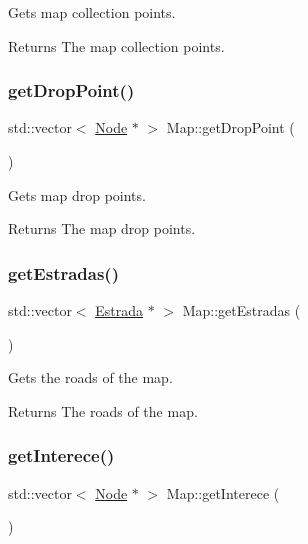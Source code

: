 Gets map collection points. 

\begin{DoxyReturn}{Returns}
The map collection points. 
\end{DoxyReturn}
\mbox{\label{class_map_a28915a48f8ddc0b8573197241f496337}} 
\subsubsection{\texorpdfstring{getDropPoint()}{getDropPoint()}}
{\footnotesize\ttfamily std\+::vector$<$ \mbox{\hyperlink{class_node}{Node}} $\ast$ $>$ Map\+::get\+Drop\+Point (\begin{DoxyParamCaption}{ }\end{DoxyParamCaption})}



Gets map drop points. 

\begin{DoxyReturn}{Returns}
The map drop points. 
\end{DoxyReturn}
\mbox{\label{class_map_acae882d7517fc82f90893cb5ffd08fee}} 
\subsubsection{\texorpdfstring{getEstradas()}{getEstradas()}}
{\footnotesize\ttfamily std\+::vector$<$ \mbox{\hyperlink{class_estrada}{Estrada}} $\ast$ $>$ Map\+::get\+Estradas (\begin{DoxyParamCaption}{ }\end{DoxyParamCaption})}



Gets the roads of the map. 

\begin{DoxyReturn}{Returns}
The roads of the map. 
\end{DoxyReturn}
\mbox{\label{class_map_a1f3f1eff9d45c161fba74967a52a0d0f}} 
\subsubsection{\texorpdfstring{getInterece()}{getInterece()}}
{\footnotesize\ttfamily std\+::vector$<$ \mbox{\hyperlink{class_node}{Node}} $\ast$ $>$ Map\+::get\+Interece (\begin{DoxyParamCaption}{ }\end{DoxyParamCaption})}



